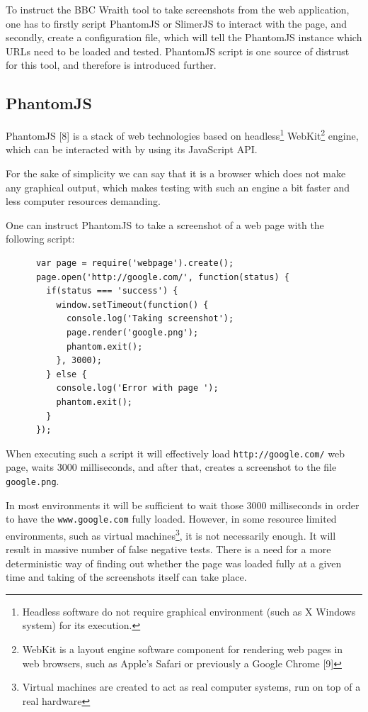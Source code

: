 \documentclass[11pt,oneside,final]{fithesis2}
\begin{document}
  To instruct the BBC Wraith tool to take screenshots from the web application, one has to firstly script PhantomJS or SlimerJS to interact with the page, and secondly, create a 
  configuration file, which will tell the PhantomJS instance which URLs need to be loaded and tested. PhantomJS script is one source of distrust for this tool, and therefore is
  introduced further.
  
    \subsection{PhantomJS}
    \label{subsec:phantomJS}
    PhantomJS [8] is a stack of web technologies based on headless\footnote{Headless software do not require graphical environment (such as X Windows system) for its execution.} 
    WebKit\footnote{WebKit is a layout engine software component for rendering web pages in web browsers, such as Apple's Safari or previously a Google Chrome [9]} engine, which can be 
    interacted with by using its JavaScript API.
    
    For the sake of simplicity we can say that it is a browser which does not make any graphical output, which makes testing with such an engine a bit faster and less computer resources 
    demanding.
    
    One can instruct PhantomJS to take a screenshot of a web page with the following script:
  
    \begin{verbatim}
      var page = require('webpage').create();
      page.open('http://google.com/', function(status) {
        if(status === 'success') {
          window.setTimeout(function() {
            console.log('Taking screenshot');
            page.render('google.png');
            phantom.exit();
          }, 3000);
        } else {
          console.log('Error with page ');
          phantom.exit();
        }
      });
    \end{verbatim}
    
    When executing such a script it will effectively load \texttt{http://google.com/} web page, waits 3000 milliseconds, and after that, creates a screenshot to the file \texttt{google.png}.
    
    In most environments it will be sufficient to wait those 3000 milliseconds in order to have the \texttt{www.google.com} fully loaded. However, in some resource limited environments, 
    such as virtual machines\footnote{Virtual machines are created to act as real computer systems, run on top of a real hardware}, it is not necessarily enough. 
    It will result in massive number of false negative tests. There is a need for a more deterministic way of finding out whether the page was loaded fully at a given time and 
    taking of the screenshots itself can take place.
    
\end{document}
